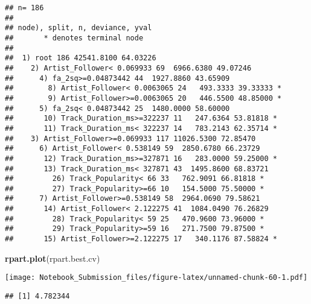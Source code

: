 \documentclass[
]{article}
\newenvironment{Shaded}{\begin{snugshade}}{\end{snugshade}}
\newcommand{\CommentTok}[1]{\textcolor[rgb]{0.56,0.35,0.01}{\textit{#1}}}
\newcommand{\DataTypeTok}[1]{\textcolor[rgb]{0.13,0.29,0.53}{#1}}
\newcommand{\KeywordTok}[1]{\textcolor[rgb]{0.13,0.29,0.53}{\textbf{#1}}}
\newcommand{\NormalTok}[1]{#1}
\newcommand{\OperatorTok}[1]{\textcolor[rgb]{0.81,0.36,0.00}{\textbf{#1}}}
\begin{document}
\begin{verbatim}
## n= 186 
## 
## node), split, n, deviance, yval
##       * denotes terminal node
## 
##  1) root 186 42541.8100 64.03226  
##    2) Artist_Follower< 0.069933 69  6966.6380 49.07246  
##      4) fa_2sq>=0.04873442 44  1927.8860 43.65909  
##        8) Artist_Follower< 0.0063065 24   493.3333 39.33333 *
##        9) Artist_Follower>=0.0063065 20   446.5500 48.85000 *
##      5) fa_2sq< 0.04873442 25  1480.0000 58.60000  
##       10) Track_Duration_ms>=322237 11   247.6364 53.81818 *
##       11) Track_Duration_ms< 322237 14   783.2143 62.35714 *
##    3) Artist_Follower>=0.069933 117 11026.5300 72.85470  
##      6) Artist_Follower< 0.538149 59  2850.6780 66.23729  
##       12) Track_Duration_ms>=327871 16   283.0000 59.25000 *
##       13) Track_Duration_ms< 327871 43  1495.8600 68.83721  
##         26) Track_Popularity< 66 33   762.9091 66.81818 *
##         27) Track_Popularity>=66 10   154.5000 75.50000 *
##      7) Artist_Follower>=0.538149 58  2964.0690 79.58621  
##       14) Artist_Follower< 2.122275 41  1084.0490 76.26829  
##         28) Track_Popularity< 59 25   470.9600 73.96000 *
##         29) Track_Popularity>=59 16   271.7500 79.87500 *
##       15) Artist_Follower>=2.122275 17   340.1176 87.58824 *
\end{verbatim}

\begin{Shaded}
\begin{Highlighting}[]
\KeywordTok{rpart.plot}\NormalTok{(rpart.best.cv)}
\end{Highlighting}
\end{Shaded}

\texttt{[image: Notebook\_Submission\_files/figure-latex/unnamed-chunk-60-1.pdf]}

\begin{Shaded}
\end{Shaded}

\begin{verbatim}
## [1] 4.782344
\end{verbatim}

\begin{Shaded}
\end{Shaded}
\end{document}
